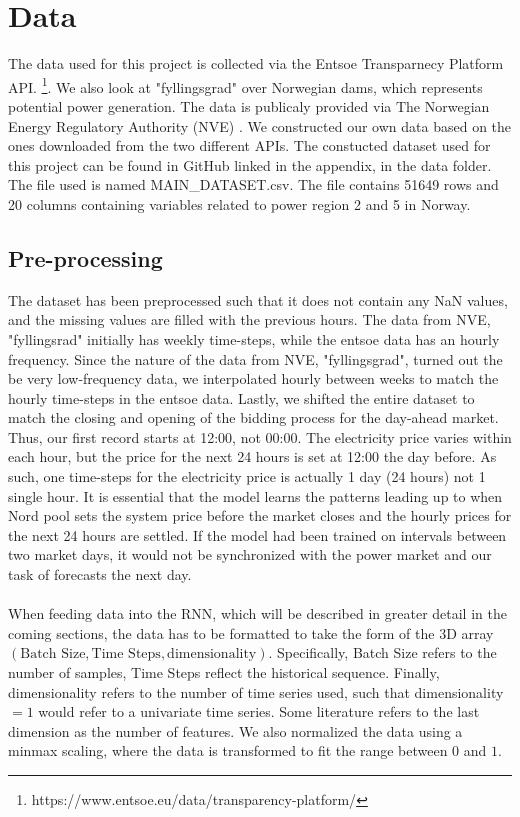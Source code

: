 \documentclass
[twocolumn,
secnumarabic,
nobibnotes,
aps,
prl,
reprint,
groupedaddress,
amsmath,
amssymb,
]{revtex4-2}
\begin{document}
\section{Data}
The data used for this project is collected via the Entsoe Transparnecy Platform API. \footnote{https://www.entsoe.eu/data/transparency-platform/}. We also look at "fyllingsgrad" over Norwegian dams, which represents potential power generation. The data is publicaly provided via The Norwegian Energy Regulatory Authority (NVE) \cite{noauthor_magasinstatistikk_nodate}. 
We constructed our own data based on the ones downloaded from the two different APIs. The constucted dataset used for this project can be found in GitHub linked in the appendix, in the data folder. The file used is named MAIN\_DATASET.csv. The file contains 51649 rows and 20 columns containing variables related to power region 2 and 5 in Norway.

\subsection{Pre-processing}
The dataset has been preprocessed such that it does not contain any NaN values, and the missing values are filled with the previous hours. The data from NVE, "fyllingsrad" initially has weekly time-steps, while the entsoe data has an hourly frequency. Since the nature of the data from NVE, "fyllingsgrad", turned out the be very low-frequency data, we interpolated hourly between weeks to match the hourly time-steps in the entsoe data. Lastly, we shifted the entire dataset to match the closing and opening of the bidding process for the day-ahead market. Thus, our first record starts at 12:00, not 00:00. The electricity price varies within each hour, but the price for the next 24 hours is set at 12:00 the day before. As such, one time-steps for the electricity price is actually 1 day (24 hours) not 1 single hour. It is essential that the model learns the patterns leading up to when Nord pool sets the system price before the market closes and the hourly prices for the next 24 hours are settled. If the model had been trained on intervals between two market days, it would not be synchronized with the power market and our task of forecasts the next day.
\\\\
When feeding data into the RNN, which will be described in greater detail in the coming sections, the data has to be formatted to take the form of the 3D array $\left(\text{Batch Size}, \text{Time Steps}, \text{dimensionality}\right)$. Specifically, Batch Size refers to the number of samples, Time Steps reflect the historical sequence. Finally, dimensionality refers to the number of time series used, such that dimensionality $= 1$ would refer to a univariate time series. Some literature refers to the last dimension as the number of features. We also normalized the data using a minmax scaling, where the data is transformed to fit the range between $0$ and $1$.
\end{document}
